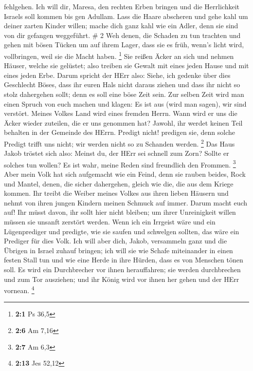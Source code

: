 fehlgehen.  Ich will dir, Maresa, den rechten Erben bringen
und die Herrlichkeit Israels soll kommen bis gen Adullam. 
Lass die Haare abscheren und gehe kahl um deiner zarten Kinder willen;
mache dich ganz kahl wie ein Adler, denn sie sind von dir gefangen
weggeführt. \# 2  Weh denen, die Schaden zu tun trachten und
gehen mit bösen Tücken um auf ihrem Lager, dass sie es früh, wenn's
licht wird, vollbringen, weil sie die Macht haben. \footnote{\textbf{2:1}
  Ps 36,5}  Sie reißen Äcker an sich und nehmen Häuser,
welche sie gelüstet; also treiben sie Gewalt mit eines jeden Hause und
mit eines jeden Erbe.  Darum spricht der HErr also: Siehe,
ich gedenke über dies Geschlecht Böses, dass ihr euren Hals nicht daraus
ziehen und dass ihr nicht so stolz dahergehen sollt; denn es soll eine
böse Zeit sein.  Zur selben Zeit wird man einen Spruch von
euch machen und klagen: Es ist aus (wird man sagen), wir sind verstört.
Meines Volkes Land wird eines fremden Herrn. Wann wird er uns die Äcker
wieder zuteilen, die er uns genommen hat?  Jawohl, ihr
werdet keinen Teil behalten in der Gemeinde des HErrn. 
Predigt nicht! predigen sie, denn solche Predigt trifft uns nicht; wir
werden nicht so zu Schanden werden. \footnote{\textbf{2:6} Am 7,16}
 Das Haus Jakob tröstet sich also: Meinst du, der HErr sei
schnell zum Zorn? Sollte er solches tun wollen? Es ist wahr, meine Reden
sind freundlich den Frommen. \footnote{\textbf{2:7} Am 6,3} 
Aber mein Volk hat sich aufgemacht wie ein Feind, denn sie rauben
beides, Rock und Mantel, denen, die sicher dahergehen, gleich wie die,
die aus dem Kriege kommen.  Ihr treibt die Weiber meines
Volkes aus ihren lieben Häusern und nehmt von ihren jungen Kindern
meinen Schmuck auf immer.  Darum macht euch auf! Ihr müsst
davon, ihr sollt hier nicht bleiben; um ihrer Unreinigkeit willen müssen
sie unsanft zerstört werden.  Wenn ich ein Irrgeist wäre
und ein Lügenprediger und predigte, wie sie saufen und schwelgen
sollten, das wäre ein Prediger für dies Volk.  Ich will
aber dich, Jakob, versammeln ganz und die Übrigen in Israel zuhauf
bringen; ich will sie wie Schafe miteinander in einen festen Stall tun
und wie eine Herde in ihre Hürden, dass es von Menschen tönen soll.
 Es wird ein Durchbrecher vor ihnen herauffahren; sie
werden durchbrechen und zum Tor ausziehen; und ihr König wird vor ihnen
her gehen und der HErr vornean. \footnote{\textbf{2:13} Jes 52,12}

